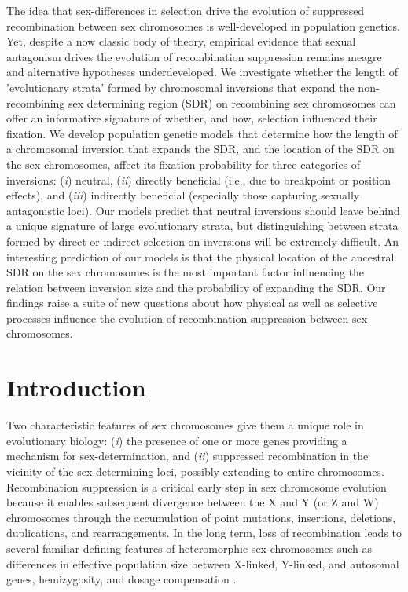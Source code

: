 \documentclass{article}
\begin{document}
\noindent{} The idea that sex-differences in selection drive the evolution of suppressed recombination between sex chromosomes is well-developed in population genetics. Yet, despite a now classic body of theory, empirical evidence that sexual antagonism drives the evolution of recombination suppression remains meagre and alternative hypotheses underdeveloped. We investigate whether the length of 'evolutionary strata' formed by chromosomal inversions that expand the non-recombining sex determining region (SDR) on recombining sex chromosomes can offer an informative signature of whether, and how, selection influenced their fixation. We develop population genetic models that determine how the length of a chromosomal inversion that expands the SDR, and the location of the SDR on the sex chromosomes, affect its fixation probability for three categories of inversions: ({\itshape i}) neutral, ({\itshape ii}) directly beneficial (i.e., due to breakpoint or position effects), and ({\itshape iii}) indirectly beneficial (especially those capturing sexually antagonistic loci). Our models predict that neutral inversions should leave behind a unique signature of large evolutionary strata, but distinguishing between strata formed by direct or indirect selection on inversions will be extremely difficult. An interesting prediction of our models is that the physical location of the ancestral SDR on the sex chromosomes is the most important factor influencing the relation between inversion size and the probability of expanding the SDR. Our findings raise a suite of new questions about how physical as well as selective processes influence the evolution of recombination suppression between sex chromosomes.
\newpage{}


\section*{Introduction} \label{sec:Introduction}

Two characteristic features of sex chromosomes give them a unique role in evolutionary biology: ({\itshape i}) the presence of one or more genes providing a mechanism for sex-determination, and ({\itshape ii}) suppressed recombination in the vicinity of the sex-determining loci, possibly extending to entire chromosomes. Recombination suppression is a critical early step in sex chromosome evolution because it enables subsequent divergence between the X and Y (or Z and W) chromosomes through the accumulation of point mutations, insertions, deletions, duplications, and rearrangements. In the long term, loss of recombination leads to several familiar defining features of heteromorphic sex chromosomes such as differences in effective population size between X-linked, Y-linked, and autosomal genes, hemizygosity, and dosage compensation \citep{CharlesworthMarais2005, BergeroCharlesworth2009,BeukeboomPerrin2014}.
	
\end{document}

